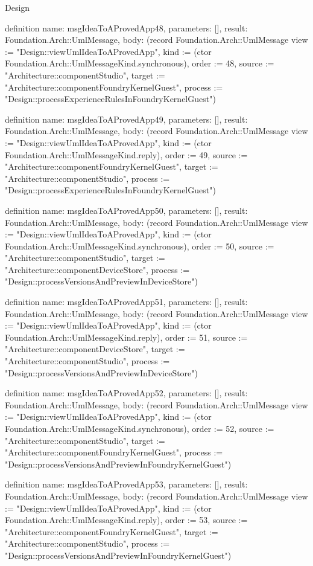 \begin{lexlean}{Design}
\begin{semanticmodule}
definition{
  name: msgIdeaToAProvedApp48,
  parameters: [],
  result: Foundation.Arch::UmlMessage,
  body: (record Foundation.Arch::UmlMessage {view := "Design::viewUmlIdeaToAProvedApp", kind := (ctor Foundation.Arch::UmlMessageKind.synchronous), order := 48, source := "Architecture::componentStudio", target := "Architecture::componentFoundryKernelGuest", process := "Design::processExperienceRulesInFoundryKernelGuest"})
}

definition{
  name: msgIdeaToAProvedApp49,
  parameters: [],
  result: Foundation.Arch::UmlMessage,
  body: (record Foundation.Arch::UmlMessage {view := "Design::viewUmlIdeaToAProvedApp", kind := (ctor Foundation.Arch::UmlMessageKind.reply), order := 49, source := "Architecture::componentFoundryKernelGuest", target := "Architecture::componentStudio", process := "Design::processExperienceRulesInFoundryKernelGuest"})
}

definition{
  name: msgIdeaToAProvedApp50,
  parameters: [],
  result: Foundation.Arch::UmlMessage,
  body: (record Foundation.Arch::UmlMessage {view := "Design::viewUmlIdeaToAProvedApp", kind := (ctor Foundation.Arch::UmlMessageKind.synchronous), order := 50, source := "Architecture::componentStudio", target := "Architecture::componentDeviceStore", process := "Design::processVersionsAndPreviewInDeviceStore"})
}

definition{
  name: msgIdeaToAProvedApp51,
  parameters: [],
  result: Foundation.Arch::UmlMessage,
  body: (record Foundation.Arch::UmlMessage {view := "Design::viewUmlIdeaToAProvedApp", kind := (ctor Foundation.Arch::UmlMessageKind.reply), order := 51, source := "Architecture::componentDeviceStore", target := "Architecture::componentStudio", process := "Design::processVersionsAndPreviewInDeviceStore"})
}

definition{
  name: msgIdeaToAProvedApp52,
  parameters: [],
  result: Foundation.Arch::UmlMessage,
  body: (record Foundation.Arch::UmlMessage {view := "Design::viewUmlIdeaToAProvedApp", kind := (ctor Foundation.Arch::UmlMessageKind.synchronous), order := 52, source := "Architecture::componentStudio", target := "Architecture::componentFoundryKernelGuest", process := "Design::processVersionsAndPreviewInFoundryKernelGuest"})
}

definition{
  name: msgIdeaToAProvedApp53,
  parameters: [],
  result: Foundation.Arch::UmlMessage,
  body: (record Foundation.Arch::UmlMessage {view := "Design::viewUmlIdeaToAProvedApp", kind := (ctor Foundation.Arch::UmlMessageKind.reply), order := 53, source := "Architecture::componentFoundryKernelGuest", target := "Architecture::componentStudio", process := "Design::processVersionsAndPreviewInFoundryKernelGuest"})
}


\end{semanticmodule}
\end{lexlean}
